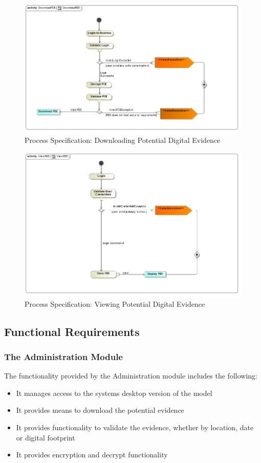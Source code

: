 \documentclass[a4paper,12pt]{article}
\begin{document}
\begin{figure}[H]
\includegraphics[width=\textwidth]{images/DownloadPDE.jpg}
\caption{Process Specification: Downloading Potential Digital Evidence \label{overflow}}
\end{figure}

\begin{figure}[H]
\includegraphics[width=\textwidth]{images/ViewPDE.jpg}
\caption{Process Specification: Viewing Potential Digital Evidence \label{overflow}}
\end{figure}

\subsection{Functional Requirements}

\subsubsection {The Administration Module}
The functionality provided by the Administration module includes the following:
\begin{itemize}
\item It manages access to the systems desktop version of the model
\item It provides means to download the potential evidence
\item It provides functionality to validate the evidence, whether by location, date or digital footprint
\item It provides encryption and decrypt functionality
\end{itemize}
\end{document}
